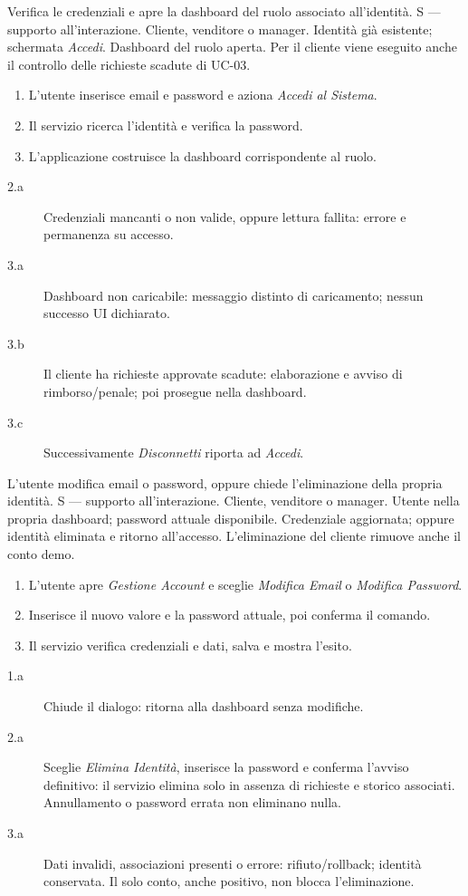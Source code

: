 \clearpage
{}
{Verifica le credenziali e apre la dashboard del ruolo associato all'identit\`a.}
{S --- supporto all'interazione.}
{Cliente, venditore o manager.}
{Identit\`a gi\`a esistente; schermata \emph{Accedi}.}
{Dashboard del ruolo aperta. Per il cliente viene eseguito anche il controllo delle richieste scadute di UC-03.}
\principale
\begin{enumerate}
\item L'utente inserisce email e password e aziona \emph{Accedi al Sistema}.
\item Il servizio ricerca l'identit\`a e verifica la password.
\item L'applicazione costruisce la dashboard corrispondente al ruolo.
\end{enumerate}
\alternative
\begin{description}
\item[2.a] Credenziali mancanti o non valide, oppure lettura fallita: errore e permanenza su accesso.
\item[3.a] Dashboard non caricabile: messaggio distinto di caricamento; nessun successo UI dichiarato.
\item[3.b] Il cliente ha richieste approvate scadute: elaborazione e avviso di rimborso/penale;
  poi prosegue nella dashboard.
\item[3.c] Successivamente \emph{Disconnetti} riporta ad \emph{Accedi}.
\end{description}

\clearpage
{}
{L'utente modifica email o password, oppure chiede l'eliminazione della propria identit\`a.}
{S --- supporto all'interazione.}
{Cliente, venditore o manager.}
{Utente nella propria dashboard; password attuale disponibile.}
{Credenziale aggiornata; oppure identit\`a eliminata e ritorno all'accesso.
L'eliminazione del cliente rimuove anche il conto demo.}
\principale
\begin{enumerate}
\item L'utente apre \emph{Gestione Account} e sceglie \emph{Modifica Email} o \emph{Modifica Password}.
\item Inserisce il nuovo valore e la password attuale, poi conferma il comando.
\item Il servizio verifica credenziali e dati, salva e mostra l'esito.
\end{enumerate}
\alternative
\begin{description}
\item[1.a] Chiude il dialogo: ritorna alla dashboard senza modifiche.
\item[2.a] Sceglie \emph{Elimina Identit\`a}, inserisce la password e conferma
  l'avviso definitivo: il servizio elimina solo in assenza di richieste e storico associati.
  Annullamento o password errata non eliminano nulla.
\item[3.a] Dati invalidi, associazioni presenti o errore: rifiuto/rollback;
  identit\`a conservata. Il solo conto, anche positivo, non blocca l'eliminazione.
\end{description}

